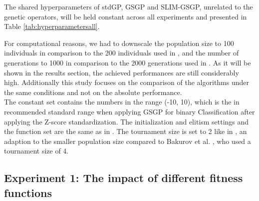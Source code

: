 \documentclass[manuscript, review, anonymous]{acmart} %
\begin{document}
The shared hyperparameters of stdGP, GSGP and SLIM-GSGP, unrelated to
the genetic operators, will be held constant across all experiments
and presented in Table \ref{tab:hyperparametersall}.

\noindent For computational reasons, we had to downscale the population size
to 100 individuals in comparison to the 200 individuals used
in \cite{Vanneschi2024},
and the number of generations to 1000 in comparison to
the 2000 generations used in \cite{Vanneschi2024, Bakurov2022}. As it will
be shown in the results section,
the achieved performances are still considerably high. Additionally this study
focuses on the comparison of the algorithms under the same
conditions
and not on the absolute performance.\\
The constant set contains the numbers in the range (-10,
10), which is the in
\cite{Bakurov2022} recommended standard range when applying GSGP for binary Classification
after applying the Z-score standardization.
The initialization and elitism settings and the function set are
the same
as in \cite{Vanneschi2024, Bakurov2022}. The tournament size is set to
2 like in \cite{Vanneschi2024},
an adaption to the smaller population size compared to Bakurov et al. \cite{Bakurov2022},
who used a tournament size of 4.



\subsection{Experiment 1: The impact of different fitness functions}
\label{sec:exp1}
\end{document}
